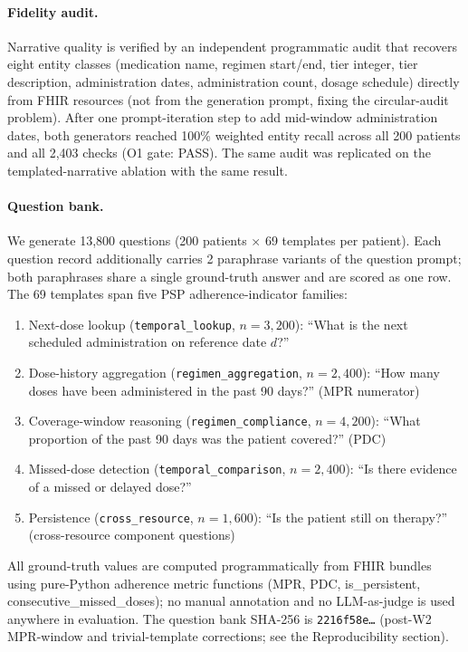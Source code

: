\paragraph{Fidelity audit.}
Narrative quality is verified by an independent programmatic audit that recovers eight entity
classes (medication name, regimen start/end, tier integer, tier description, administration
dates, administration count, dosage schedule) directly from FHIR resources (not from the
generation prompt, fixing the circular-audit problem).  After one prompt-iteration step to
add mid-window administration dates, both generators reached 100\% weighted entity
recall across all 200 patients and all 2,403 checks (O1 gate: PASS).  The same audit
was replicated on the templated-narrative ablation with the same result.

\paragraph{Question bank.}
We generate 13,800 questions (200 patients $\times$ 69 templates per patient).  Each
question record additionally carries 2 paraphrase variants of the question prompt;
both paraphrases share a single ground-truth answer and are scored as one row.  The
69 templates span five PSP adherence-indicator families:
\begin{enumerate}
  \item Next-dose lookup (\texttt{temporal\_lookup}, $n=3{,}200$): ``What is the
    next scheduled administration on reference date $d$?''
  \item Dose-history aggregation (\texttt{regimen\_aggregation}, $n=2{,}400$): ``How many
    doses have been administered in the past 90 days?'' (MPR numerator)
  \item Coverage-window reasoning (\texttt{regimen\_compliance}, $n=4{,}200$): ``What
    proportion of the past 90 days was the patient covered?'' (PDC)
  \item Missed-dose detection (\texttt{temporal\_comparison}, $n=2{,}400$): ``Is there
    evidence of a missed or delayed dose?''
  \item Persistence (\texttt{cross\_resource}, $n=1{,}600$): ``Is the patient still on
    therapy?'' (cross-resource component questions)
\end{enumerate}
All ground-truth values are computed programmatically from FHIR bundles using pure-Python
adherence metric functions (MPR, PDC, is\_persistent, consecutive\_missed\_doses); no manual
annotation and no LLM-as-judge is used anywhere in evaluation.  The question bank SHA-256
is \texttt{2216f58e\ldots} (post-W2 MPR-window and trivial-template corrections;
see the Reproducibility section).

